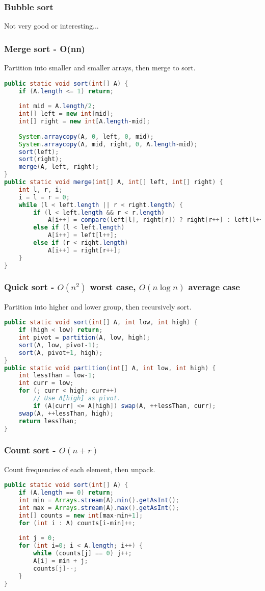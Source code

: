 \documentclass{article}
\begin{document}
\subsubsection{Bubble sort}
Not very good or interesting...

\subsubsection{Merge sort - O(n\log n)}
Partition into smaller and smaller arrays, then merge to sort.
\begin{lstlisting}[language=java]
public static void sort(int[] A) {
    if (A.length <= 1) return;
    
    int mid = A.length/2;
    int[] left = new int[mid];
    int[] right = new int[A.length-mid];
    
    System.arraycopy(A, 0, left, 0, mid);
    System.arraycopy(A, mid, right, 0, A.length-mid);
    sort(left);
    sort(right);
    merge(A, left, right);
}
public static void merge(int[] A, int[] left, int[] right) {
    int l, r, i;
    i = l = r = 0;
    while (l < left.length || r < right.length) {
        if (l < left.length && r < r.length)
            A[i++] = compare(left[l], right[r]) ? right[r++] : left[l++];
        else if (l < left.length)
            A[i++] = left[l++];
        else if (r < right.length)
            A[i++] = right[r++];
    }    
}
\end{lstlisting}

\subsubsection{Quick sort - $O(n^2)$ worst case, $O(n\log n)$ average case}
Partition into higher and lower group, then recursively sort.
\begin{lstlisting}[language=java]
public static void sort(int[] A, int low, int high) {
    if (high < low) return;
    int pivot = partition(A, low, high);
    sort(A, low, pivot-1);
    sort(A, pivot+1, high);
}
public static void partition(int[] A, int low, int high) {
    int lessThan = low-1;
    int curr = low;
    for (; curr < high; curr++)
        // Use A[high] as pivot.
        if (A[curr] <= A[high]) swap(A, ++lessThan, curr);
    swap(A, ++lessThan, high);
    return lessThan;
}
\end{lstlisting}

\subsubsection{Count sort - $O(n+r)$}
Count frequencies of each element, then unpack.
\begin{lstlisting}[language=java]
public static void sort(int[] A) {
    if (A.length == 0) return;
    int min = Arrays.stream(A).min().getAsInt();
    int max = Arrays.stream(A).max().getAsInt();
    int[] counts = new int[max-min+1];
    for (int i : A) counts[i-min]++;
    
    int j = 0;
    for (int i=0; i < A.length; i++) {
        while (counts[j] == 0) j++;
        A[i] = min + j;
        counts[j]--;
    }
}
\end{lstlisting}
\end{document}
